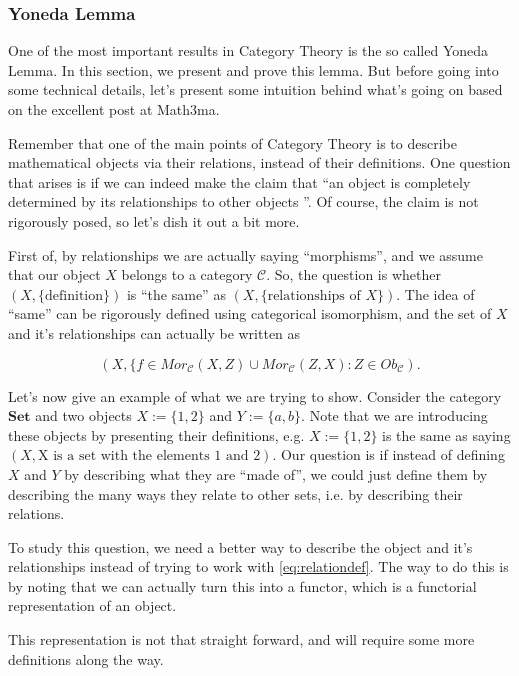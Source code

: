 \subsubsection{Yoneda Lemma}

One of the most important results in Category Theory is the so called Yoneda Lemma.
In this section, we present and prove this lemma. But before going into some
technical details, let's present some intuition behind what's
going on based on the excellent post at Math3ma.

Remember that one of the main points of Category Theory is to describe mathematical
objects via their relations, instead of their definitions. One question that
arises is if we can indeed make the claim that ``an object is
completely determined by its relationships to other objects
''. Of course, the claim is not rigorously posed, so let's dish it out a bit more.

First of, by relationships we are actually saying ``morphisms'',
and we assume that our object $X$ belongs to a category $\mathcal C$.
So, the question is whether $(X, \{\text{definition}\})$ is ``the same''
as $(X, \{\text{relationships of }X\})$. The idea of ``same'' can
be rigorously defined using categorical isomorphism, and the
set of $X$ and it's relationships can actually be written as

\begin{equation}
	(X, \{ f \in Mor_\mathcal C(X,Z) \cup Mor_\mathcal C(Z,X): Z \in Ob_\mathcal C).
	\label{eq:relationdef}
\end{equation}

Let's now give an example of what we are trying to show. Consider the category $\mathbf{Set}$
and two objects $X:=\{1,2\}$ and $Y :=\{a,b\}$. Note that we are introducing these objects
by presenting their definitions, e.g. $X:=\{1,2\}$ is the same as saying
$(X,\text{X is a set with the elements 1 and 2})$. Our question is if instead of
defining $X$ and $Y$ by describing what they are ``made of'', we could just
define them by describing the many ways they relate to other sets, i.e. by describing their relations.

To study this question, we need a better way to describe the object and it's relationships
instead of trying to work with \eqref{eq:relationdef}. The way to do this is
by noting that we can actually turn this into a functor, which is
a functorial representation of an object.

This representation is not that straight forward, and will require
some more definitions along the way.

